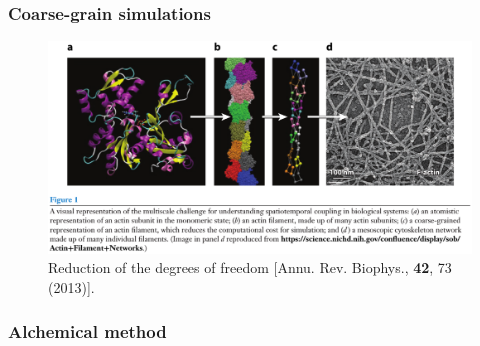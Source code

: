 \documentclass{beamer}
\begin{document}
\begin{frame}
\frametitle{Coarse-grain simulations}
\begin{figure}
\includegraphics[scale=0.23]{coarse-grain-meso.eps}
\caption{{\scriptsize  Reduction of the degrees of freedom [Annu. Rev. Biophys., {\bf 42}, 73 (2013)]. }}
\end{figure}
\end{frame}



\subsubsection{Alchemical method} 
\end{document}
